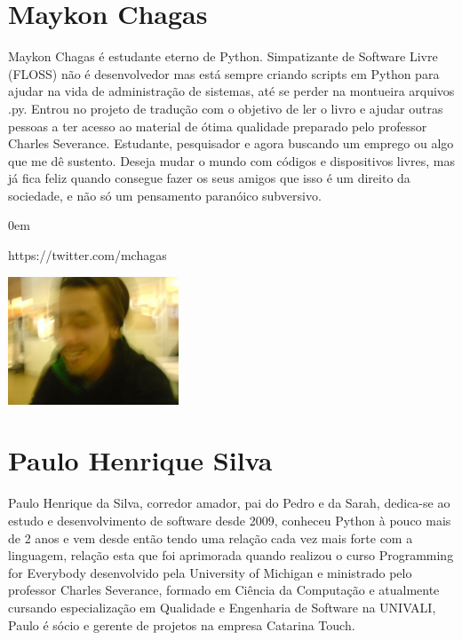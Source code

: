 \section*{Maykon Chagas}

Maykon Chagas é estudante eterno de Python. Simpatizante de Software Livre (FLOSS) não é desenvolvedor mas está sempre criando scripts em Python para ajudar na vida de administração de sistemas, até se perder na montueira arquivos .py. Entrou no projeto de tradução com o objetivo de ler o livro e ajudar outras pessoas a ter acesso ao material de ótima qualidade preparado pelo professor Charles Severance. Estudante, pesquisador e agora buscando um emprego ou algo que me dê sustento. Deseja mudar o mundo com códigos e dispositivos livres, mas já fica feliz quando consegue fazer os seus amigos que isso é um direito da sociedade, e não só um pensamento paranóico subversivo.

\begin{description}
\itemsep0em 
\item[Twitter] https://twitter.com/mchagas
\end{description}

\beforefig
\centerline{\includegraphics[height=1.50in]{translators/maykonchagas.eps}}
\afterfig

\section*{Paulo Henrique Silva}

Paulo Henrique da Silva, corredor amador, pai do Pedro e da Sarah, dedica-se ao estudo e desenvolvimento de software desde 2009, conheceu Python à pouco mais de 2 anos e vem desde então tendo uma relação cada vez mais forte com a linguagem, relação esta que foi aprimorada quando realizou o curso Programming for Everybody desenvolvido pela University of Michigan e ministrado pelo professor Charles Severance, formado em Ciência da Computação e atualmente cursando especialização em Qualidade e Engenharia de Software na UNIVALI, Paulo é sócio e gerente de projetos na empresa Catarina Touch.
 
